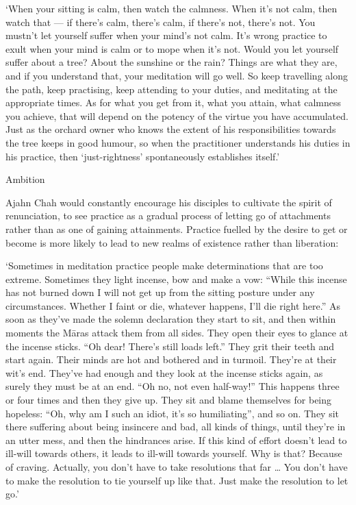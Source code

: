 `When your sitting is calm, then watch the calmness. When it's not calm,
then watch that --- if there's calm, there's calm, if there's not,
there's not. You mustn't let yourself suffer when your mind's not calm.
It's wrong practice to exult when your mind is calm or to mope when it's
not. Would you let yourself suffer about a tree? About the sunshine or
the rain? Things are what they are, and if you understand that, your
meditation will go well. So keep travelling along the path, keep
practising, keep attending to your duties, and meditating at the
appropriate times. As for what you get from it, what you attain, what
calmness you achieve, that will depend on the potency of the virtue you
have accumulated. Just as the orchard owner who knows the extent of his
responsibilities towards the tree keeps in good humour, so when the
practitioner understands his duties in his practice, then
`just-rightness' spontaneously establishes itself.'

Ambition

Ajahn Chah would constantly encourage his disciples to cultivate the
spirit of renunciation, to see practice as a gradual process of letting
go of attachments rather than as one of gaining attainments. Practice
fuelled by the desire to get or become is more likely to lead to new
realms of existence rather than liberation:

`Sometimes in meditation practice people make determinations that are
too extreme. Sometimes they light incense, bow and make a vow: ``While
this incense has not burned down I will not get up from the sitting
posture under any circumstances. Whether I faint or die, whatever
happens, I'll die right here.'' As soon as they've made the solemn
declaration they start to sit, and then within moments the Māras attack
them from all sides. They open their eyes to glance at the incense
sticks. ``Oh dear! There's still loads left.'' They grit their teeth and
start again. Their minds are hot and bothered and in turmoil. They're at
their wit's end. They've had enough and they look at the incense sticks
again, as surely they must be at an end. ``Oh no, not even half-way!''
This happens three or four times and then they give up. They sit and
blame themselves for being hopeless: ``Oh, why am I such an idiot, it's
so humiliating'', and so on. They sit there suffering about being
insincere and bad, all kinds of things, until they're in an utter mess,
and then the hindrances arise. If this kind of effort doesn't lead to
ill-will towards others, it leads to ill-will towards yourself. Why is
that? Because of craving. Actually, you don't have to take resolutions
that far \ldots{} You don't have to make the resolution to tie yourself
up like that. Just make the resolution to let go.'

